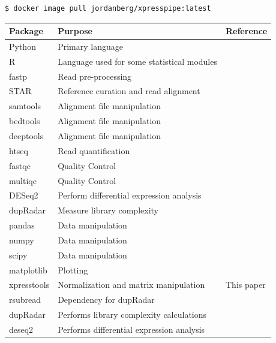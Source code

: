 \documentclass[11pt, a4paper, oneside]{article}
\begin{document}
\begin{lstlisting}[language=bash, caption=curateReference example]
$ docker image pull jordanberg/xpresspipe:latest
\end{lstlisting}

\begin{tabular}{p{2.4cm}p{7.5cm}p{3cm}}
 \textbf{Package} & \textbf{Purpose} & \textbf{Reference} \\
 \hline
 Python & Primary language & \\
 \hline
 R & Language used for some statistical modules & \\
 \hline
 fastp & Read pre-processing & \cite{fastp} \\
 \hline
 STAR & Reference curation and read alignment & \cite{star} \\
 \hline
 samtools & Alignment file manipulation & \cite{samtools} \\
 \hline
 bedtools & Alignment file manipulation & \cite{bedtools} \\
 \hline
 deeptools & Alignment file manipulation & \cite{deeptools} \\
 \hline
 htseq & Read quantification & \cite{htseq} \\
 \hline
 fastqc & Quality Control & \cite{fastqc} \\
 \hline
 multiqc & Quality Control & \cite{multiqc} \\
 \hline
 DESeq2 & Perform differential expression analysis & \cite{deseq2} \\
 \hline
 dupRadar & Measure library complexity & \cite{dupradar} \\
 \hline
 pandas & Data manipulation & \cite{pandas} \\
 \hline
 numpy & Data manipulation & \cite{numpy1, numpy2} \\
 \hline
 scipy & Data manipulation & \cite{scipy} \\
 \hline
 matplotlib & Plotting & \cite{matplotlib} \\
 \hline
 xpresstools & Normalization and matrix manipulation & This paper \\
 \hline
 rsubread & Dependency for dupRadar & \cite{rsubread} \\
 \hline
 dupRadar & Performs library complexity calculations & \cite{dupradar} \\
 \hline
 deseq2 & Performs differential expression analysis & \cite{deseq2} \\

\end{tabular}
\newline
\end{document}
